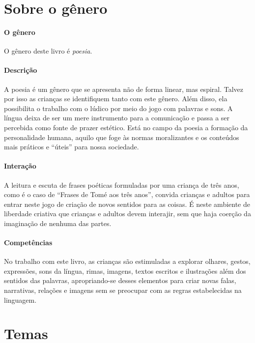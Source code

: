 \documentclass[11pt]{extarticle}
\begin{document}
\section{Sobre o gênero}

\paragraph{O gênero} O gênero deste livro é \textit{poesia}. 

\paragraph{Descrição} A poesia é um gênero que se apresenta não de forma
linear, mas espiral. Talvez por isso as crianças se identifiquem
tanto com este gênero. Além disso, ela possibilita o trabalho com
o lúdico por meio do jogo com palavras e sons. A língua deixa de
ser um mere instrumento para a comunicação e passa a ser percebida
como fonte de prazer estético. Está no campo da poesia a formação da personalidade
humana, aquilo que foge às normas moralizantes e os conteúdos mais
práticos e ``úteis'' para nossa sociedade. 

\paragraph{Interação} A leitura e escuta de frases poéticas 
formuladas por uma criança de três anos, como é o caso de ``Frases de Tomé aos três anos'',
convida crianças e adultos para entrar neste jogo de criação de novos sentidos
para as coisas. É neste ambiente de liberdade criativa que crianças e adultos devem
interajir, sem que haja coerção da imaginação de nenhuma das partes. 


\paragraph{Competências} No trabalho com este livro, as crianças são 
estimuladas a explorar olhares, gestos, expressões, sons da língua, 
rimas, imagens, textos escritos e ilustrações além dos sentidos das palavras, 
apropriando-se desses elementos para criar novas falas, narrativas, relações 
e imagens sem se preocupar com as regras estabelecidas na linguagem.



\section{Temas}
\end{document}
